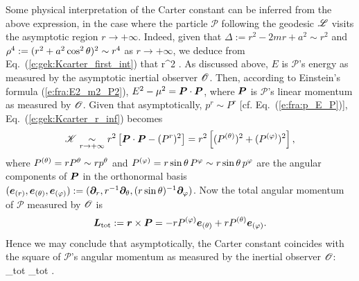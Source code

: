 Some physical interpretation of the Carter constant can be inferred from the above
expression, in the case where the particle $\mathscr{P}$ following the
geodesic $\mathscr{L}$ visits the asymptotic region $r\to+\infty$. Indeed, given
that $\Delta := r^2 - 2m r + a^2 \sim r^2$  and $\rho^4 := (r^2 + a^2\cos^2\theta)^2 \sim r^4$
as $r\to+\infty$, we deduce from Eq.~(\ref{e:gek:Kcarter_first_int})
that
\be \label{e:gek:Kcarter_r_inf}
      r^2 \left[ E^2 - \mu^2 - (p^r)^2 \right] .
\ee
As discussed above, $E$ is $\mathscr{P}$'s energy as measured by
the asymptotic inertial observer $\mathscr{O}$. Then, according to
Einstein's formula (\ref{e:fra:E2_m2_P2}), $E^2 - \mu^2 = \bm{P}\cdot\bm{P}$, where
$\bm{P}$ is $\mathscr{P}$'s linear momentum as measured by $\mathscr{O}$. Given
that asymptotically, $p^r\sim P^r$ [cf. Eq.~(\ref{e:fra:p_E_P})],
Eq.~(\ref{e:gek:Kcarter_r_inf}) becomes
\[
    \mathscr{K} \underset{r\to + \infty}{\sim} r^2 \left[ \bm{P}\cdot\bm{P} - (P^r)^2 \right]
    = r^2 \left[ (P^{(\theta)})^2 + (P^{(\varphi)})^2 \right],
\]
where $P^{(\theta)} = r P^\theta \sim r p^\theta$ and $P^{(\varphi)} = r\sin\theta\, P^\varphi \sim r\sin\theta\, p^\varphi$
are the angular components of $\bm{P}$ in the
orthonormal basis $(\bm{e}_{(r)}, \bm{e}_{(\theta)}, \bm{e}_{(\varphi)}) := (\bm{\partial}_r, r^{-1} \bm{\partial}_\theta,
(r\sin\theta)^{-1}\bm{\partial}_\varphi)$.
Now the total angular momentum of $\mathscr{P}$ measured by $\mathscr{O}$ is
\[
    \bm{L}_{\rm tot} := \bm{r} \times \bm{P} = - r P^{(\varphi)} \bm{e}_{(\theta)}
        + r P^{(\theta)} \bm{e}_{(\varphi)} .
\]
Hence we may conclude that asymptotically, the Carter constant coincides with
the square of $\mathscr{P}$'s angular momentum as measured by the inertial observer $\mathscr{O}$:
\be \label{e:gek:Kcarter_asymptot}
      _{\rm tot} \cdot {}_{\rm tot} .
\ee

